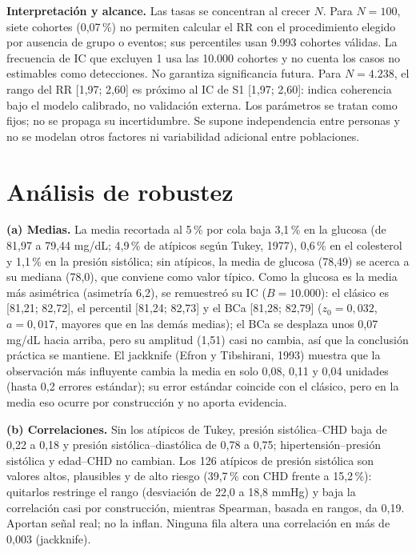 \documentclass[11pt,a4paper]{article}
\begin{document}
\textbf{Interpretación y alcance.} Las tasas se concentran al crecer $N$. Para $N=100$, siete cohortes (0,07\,\%) no permiten calcular el RR con el procedimiento elegido por ausencia de grupo o eventos; sus percentiles usan 9.993 cohortes válidas. La frecuencia de IC que excluyen 1 usa las 10.000 cohortes y no cuenta los casos no estimables como detecciones. No garantiza significancia futura. Para $N=4.238$, el rango del RR [1,97; 2,60] es próximo al IC de S1 [1,97; 2,60]: indica coherencia bajo el modelo calibrado, no validación externa. Los parámetros se tratan como fijos; no se propaga su incertidumbre. Se supone independencia entre personas y no se modelan otros factores ni variabilidad adicional entre poblaciones.

\section{Análisis de robustez}

\textbf{(a) Medias.} La media recortada al 5\,\% por cola baja 3,1\,\% en la glucosa (de 81,97 a 79,44 mg/dL; 4,9\,\% de atípicos según Tukey, 1977), 0,6\,\% en el colesterol y 1,1\,\% en la presión sistólica; sin atípicos, la media de glucosa (78,49) se acerca a su mediana (78,0), que conviene como valor típico. Como la glucosa es la media más asimétrica (asimetría 6,2), se remuestreó su IC ($B=10.000$): el clásico es [81,21; 82,72], el percentil [81,24; 82,73] y el BCa [81,28; 82,79] ($z_0=0{,}032$, $a=0{,}017$, mayores que en las demás medias); el BCa se desplaza unos 0,07 mg/dL hacia arriba, pero su amplitud (1,51) casi no cambia, así que la conclusión práctica se mantiene. El jackknife (Efron y Tibshirani, 1993) muestra que la observación más influyente cambia la media en solo 0,08, 0,11 y 0,04 unidades (hasta 0,2 errores estándar); su error estándar coincide con el clásico, pero en la media eso ocurre por construcción y no aporta evidencia.

\textbf{(b) Correlaciones.} Sin los atípicos de Tukey, presión sistólica--CHD baja de 0,22 a 0,18 y presión sistólica--diastólica de 0,78 a 0,75; hipertensión--presión sistólica y edad--CHD no cambian. Los 126 atípicos de presión sistólica son valores altos, plausibles y de alto riesgo (39,7\,\% con CHD frente a 15,2\,\%): quitarlos restringe el rango (desviación de 22,0 a 18,8 mmHg) y baja la correlación casi por construcción, mientras Spearman, basada en rangos, da 0,19. Aportan señal real; no la inflan. Ninguna fila altera una correlación en más de 0,003 (jackknife).
\end{document}
